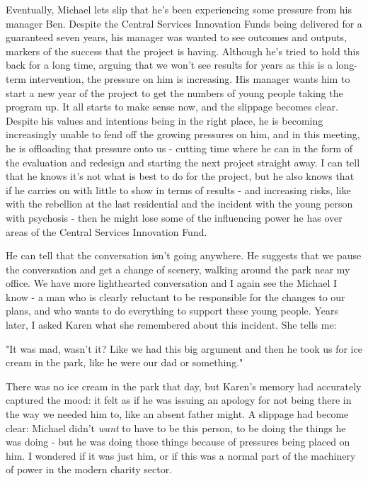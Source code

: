 Eventually, Michael lets slip that he's been experiencing some pressure from his manager Ben. Despite the Central Services Innovation Funds being delivered for a guaranteed seven years, his manager was wanted to see outcomes and outputs, markers of the success that the project is having. Although he's tried to hold this back for a long time, arguing that we won't see results for years as this is a long-term intervention, the pressure on him is increasing. His manager wants him to start a new year of the project to get the numbers of young people taking the program up. It all starts to make sense now, and the slippage becomes clear. Despite his values and intentions being in the right place, he is becoming increasingly unable to fend off the growing pressures on him, and in this meeting, he is offloading that pressure onto us - cutting time where he can in the form of the evaluation and redesign and starting the next project straight away. I can tell that he knows it's not what is best to do for the project, but he also knows that if he carries on  with little to show in terms of results - and increasing risks, like with the rebellion at the last residential and the incident with the young person with psychosis - then he might lose some of the influencing power he has over areas of the Central Services Innovation Fund.

He can tell that the conversation isn't going anywhere. He suggests that we pause the conversation and get a change of scenery, walking around the park near my office. We have more lighthearted conversation and I again see the Michael I know - a man who is clearly reluctant to be responsible for the changes to our plans, and who wants to do everything to support these young people. Years later, I asked Karen what she remembered about this incident. She tells me:

"It was mad, wasn't it? Like we had this big argument and then he took us for ice cream in the park, like he were our dad or something."

There was no ice cream in the park that day, but Karen's memory had accurately captured the mood: it felt as if he was issuing an apology for not being there in the way we needed him to, like an absent father might. A slippage had become clear: Michael didn't \textit{want} to have to be this person, to be doing the things he was doing - but he was doing those things because of pressures being placed on him. I wondered if it was just him, or if this was a normal part of the machinery of power in the modern charity sector.

